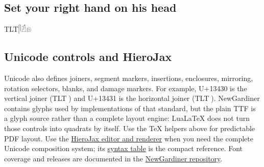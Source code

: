 \documentclass[11pt]{article}
\newcommand{\egypt}[1]{{\leavevmode\textdir TLT\NewGardinerFont #1}}
\newcommand{\egRaise}[2]{\raisebox{#1}{#2}}
\newcommand{\egMirror}[1]{\reflectbox{#1}}
\newcommand{\egOverlap}[2]{\makebox[0pt][c]{#1}#2}
\begin{document}
\egAbove[1.0]{0em}{0.2em}{\egypt{𓂜}}{𓄤𓀗}

\subsection*{Set your right hand on his head}

\egypt{𓋴𓁣\raisebox{1.2em}{\hspace{-0.5em}{𓏏}}\hspace{0.3em}\egOverlap{𓀣}{\egOverlap{\egRaise{1.1em}{\hspace{0.7em}\egMirror{𓂢}}}{\;𓁶}}}

\subsection*{Unicode controls and HieroJax}

Unicode also defines joiners, segment markers, insertions, enclosures,
mirroring, rotation selectors, blanks, and damage markers.  For example,
U+13430 is the vertical joiner (\egypt{𓐰}) and U+13431 is the horizontal
joiner (\egypt{𓐱}).  NewGardiner contains glyphs used by implementations of
that standard, but the plain TTF is a glyph source rather than a complete
layout engine: LuaLaTeX does not turn those controls into quadrats by itself.
Use the TeX helpers above for predictable PDF layout.  Use the
\href{https://nederhof.github.io/hierojax/}{HieroJax editor and renderer} when
you need the complete Unicode composition system; its
\href{https://nederhof.github.io/hierojax/syntax.html}{syntax table} is the
compact reference.  Font coverage and releases are documented in the
\href{https://github.com/nederhof/newgardiner}{NewGardiner repository}.
\end{document}
